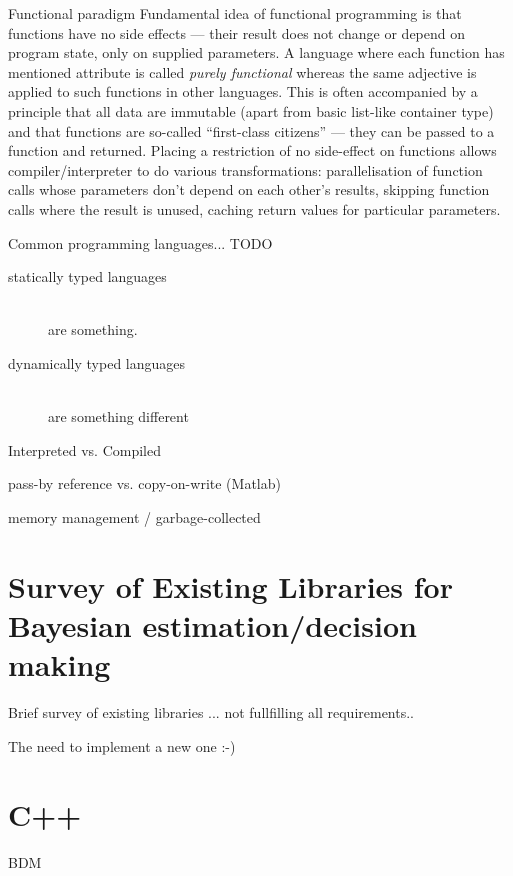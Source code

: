 \begin{subsection}{Functional paradigm}
	Fundamental idea of functional programming is that
	functions have no side effects --- their result does not change or depend on program state, only
	on supplied parameters. A language where each function has mentioned attribute is called
	\emph{purely functional} whereas the same adjective is applied to such functions in other
	languages. This is often accompanied by a principle that all data are immutable (apart from
	basic list-like container type) and that functions are so-called ``first-class citizens''
	--- they can be passed to a function and returned. Placing a restriction of no side-effect on
	functions allows compiler/interpreter to do various transformations: parallelisation of function
	calls whose parameters don't depend on each other's results, skipping function calls where the
	result is unused, caching return values for particular parameters.

	Common programming languages... TODO
\end{subsection}

\begin{description}
	\item[statically typed languages] \hfill {} \label{desc:StaticTyping} \\
		are something.
	\item[dynamically typed languages] \hfill {} \label{desc:DynamicTyping} \\
		are something different
\end{description}


Interpreted vs. Compiled

pass-by reference vs. copy-on-write (Matlab)

memory management / garbage-collected

\section{Survey of Existing Libraries for Bayesian estimation/decision making}

Brief survey of existing libraries ... not fullfilling all requirements..

The need to implement a new one :-)

\section{C++}

BDM

